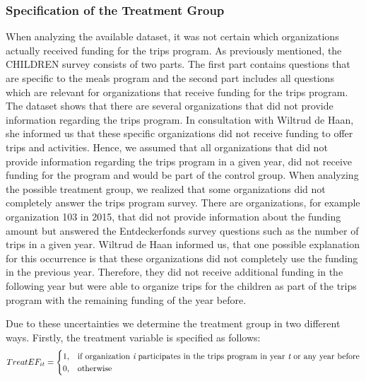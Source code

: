 \documentclass[12pt, a4paper, titlepage]{article}\usepackage[]{graphicx}\usepackage[]{color}
\begin{document}
\subsubsection{Specification of the Treatment Group}

When analyzing the available dataset, it was not certain which organizations actually received funding for the trips program. As previously mentioned, the CHILDREN survey consists of two parts. The first part contains questions that are specific to the meals program and the second part includes all questions which are relevant for organizations that receive funding for the trips program. The dataset shows that there are several organizations that did not provide information regarding the trips program. In consultation with Wiltrud de Haan, she informed us that these specific organizations did not receive funding to offer trips and activities. Hence, we assumed that all organizations that did not provide information regarding the trips program in a given year, did not receive funding for the program and would be part of the control group. When analyzing the possible treatment group, we realized that some organizations did not completely answer the trips program survey. There are organizations, for example organization 103 in 2015, that did not provide information about the funding amount but answered the Entdeckerfonds survey questions such as the number of trips in a given year. Wiltrud de Haan informed us, that one possible explanation for this occurrence is that these organizations did not completely use the funding in the previous year. Therefore, they did not receive additional funding in the following year but were able to organize trips for the children as part of the trips program with the remaining funding of the year before.

Due to these uncertainties we determine the treatment group in two different ways. Firstly, the treatment variable is specified as follows:
\begin{equation}
TreatEF_{it} =
\begin{cases}
1, & \text{if organization \begin{itshape}{i}\end{itshape} participates in the trips program in year \begin{itshape}{t}\end{itshape} or any year before}\\
0, & \text{otherwise}
\end{cases}
\end{equation}
\end{document}
